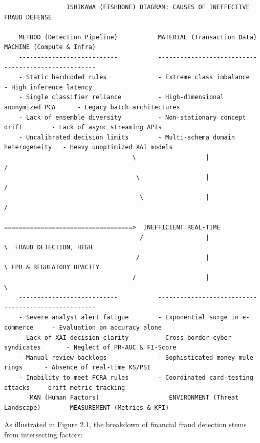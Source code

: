 \documentclass[12pt,a4paper,oneside]{report}
\begin{document}
\begin{lstlisting}
                 ISHIKAWA (FISHBONE) DIAGRAM: CAUSES OF INEFFECTIVE FRAUD DEFENSE

    METHOD (Detection Pipeline)           MATERIAL (Transaction Data)           MACHINE (Compute & Infra)
    ---------------------------           ---------------------------           -------------------------
    - Static hardcoded rules              - Extreme class imbalance             - High inference latency
    - Single classifier reliance          - High-dimensional anonymized PCA      - Legacy batch architectures
    - Lack of ensemble diversity          - Non-stationary concept drift        - Lack of async streaming APIs
    - Uncalibrated decision limits        - Multi-schema domain heterogeneity   - Heavy unoptimized XAI models
                                   \                   |                   /
                                    \                  |                  /
                                     \                 |                 /
                                      ===================================>  INEFFICIENT REAL-TIME
                                     /                 |                 \  FRAUD DETECTION, HIGH
                                    /                  |                  \ FPR & REGULATORY OPACITY
                                   /                   |                   \
    ---------------------------           ---------------------------           -------------------------
    - Severe analyst alert fatigue        - Exponential surge in e-commerce     - Evaluation on accuracy alone
    - Lack of XAI decision clarity        - Cross-border cyber syndicates       - Neglect of PR-AUC & F1-Score
    - Manual review backlogs              - Sophisticated money mule rings      - Absence of real-time KS/PSI
    - Inability to meet FCRA rules        - Coordinated card-testing attacks     drift metric tracking
       MAN (Human Factors)                   ENVIRONMENT (Threat Landscape)        MEASUREMENT (Metrics & KPI)
\end{lstlisting}

As illustrated in Figure 2.1, the breakdown of financial fraud detection stems from intersecting factors:
\end{document}
